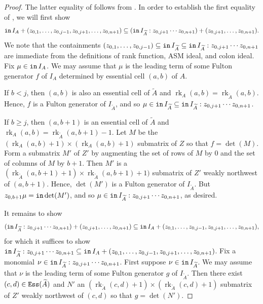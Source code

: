 \documentclass[12 pt]{amsart}
\DeclareMathOperator{\init}{{\tt in}}
\DeclareMathOperator{\ess}{{\tt Ess}}
\DeclareMathOperator{\rk}{rk}
\theoremstyle{plain}
\theoremstyle{definition}
\theoremstyle{remark}
\begin{document}
{\begin{proof}
    The latter equality of  follows from . 
 In order to establish the first equality of , we will first show \[
 \init I_A+(z_{0,1}, \ldots, z_{0,j-1}, z_{0,j+1}, \ldots, z_{0,n+1}) \subseteq (\init I_{\widetilde{A}}:z_{0,j+1}\cdots z_{0,n+1})+(z_{0,j+1}, \ldots, z_{0,n+1}).
 \] We note that the containments $(z_{0,1}, \ldots, z_{0,j-1}) \subseteq \init I_{\widetilde{A}} \subseteq \init I_{\widetilde{A}}:z_{0,j+1}\cdots z_{0,n+1}$ are immediate from the definitions of rank function, ASM ideal, and colon ideal.  Fix $\mu \in \init I_A$.  We may assume that $\mu$ is the leading term of some Fulton generator $f$ of $I_A$ determined by essential cell $(a,b)$ of $A$.  
    
    If $b<j$, then $(a,b)$ is also an essential cell of $\widetilde{A}$ and $\rk_A(a,b) = \rk_{\widetilde{A}}(a,b)$.  Hence, $f$ is a Fulton generator of $I_{\widetilde{A}}$, and so $\mu \in \init I_{\widetilde{A}} \subseteq \init I_{\widetilde{A}}:z_{0,j+1}\cdots z_{0,n+1}$.  
    
    If $b \geq j$, then $(a,b+1)$ is an essential cell of $\widetilde{A}$ and $\rk_A(a,b) = \rk_{\widetilde{A}}(a,b+1)-1$.  Let $M$ be the $(\rk_A(a,b)+1) \times (\rk_A(a,b)+1)$ submatrix of $Z$ so that $f = \det(M)$.  Form a submatrix $M'$ of $Z'$ by augmenting the set of rows of $M$ by $0$ and the set of columns of $M$ by $b+1$.  Then $M'$ is a $(\rk_{\widetilde{A}}(a,b+1)+1) \times \rk_{\widetilde{A}}(a,b+1)+1)$ submatrix of $Z'$ weakly northwest of $(a,b+1)$.  Hence, $\det(M')$ is a Fulton generator of $I_{\widetilde{A}}$.  But $z_{0,b+1}\mu = \init \det(M')$, and so $\mu \in \init I_{\widetilde{A}}:z_{0,j+1}\cdots z_{0,n+1}$, as desired.

    It remains to show \[
    (\init I_{\widetilde{A}}:z_{0,j+1}\cdots z_{0,n+1})+(z_{0,j+1}, \ldots, z_{0,n+1}) \subseteq \init I_A+(z_{0,1}, \ldots,z_{0,j-1}, z_{0,j+1}, \ldots,  z_{0,n+1}),
    \] for which it suffices to show $\init I_{\widetilde{A}}:z_{0,j+1}\cdots z_{0,n+1} \subseteq \init I_A+(z_{0,1}, \ldots,z_{0,j-1}, z_{0,j+1}, \ldots,  z_{0,n+1})$.  Fix a monomial $\nu \in \init I_{\widetilde{A}}:z_{0,j+1}\cdots z_{0,n+1}$.  First suppose $\nu \in \init I_{\widetilde{A}}$.  We may assume that $\nu$ is the leading term of some Fulton generator $g$ of $I_{\widetilde{A}}$.  Then there exist $(c,d) \in \ess(\widetilde{A})$ and $N'$ an $(\rk_{\widetilde{A}}(c,d)+1) \times (\rk_{\widetilde{A}}(c,d)+1)$ submatrix of $Z'$ weakly northwest of $(c,d)$ so that $g = \det(N')$.
    

\end{proof}}
\end{document}
